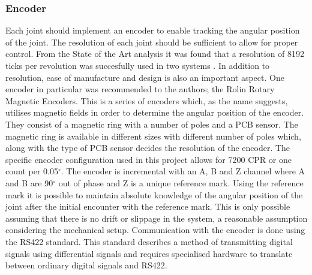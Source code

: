\subsubsection{Encoder} %
\label{ssub:encoder}
Each joint should implement an encoder to enable tracking the angular position of the joint.
The resolution of each joint should be sufficient to allow for proper control.
From the State of the Art analysis it was found that a resolution of 8192 ticks per revolution was succesfully used in two systems
.
In addition to resolution, ease of manufacture and design is also an important aspect.
One encoder in particular was recommended to the authors; the Rolin Rotary Magnetic Encoders.
This is a series of encoders which, as the name suggests, utilises magnetic fields in order to determine the angular position of the encoder.
They consist of a magnetic ring with a number of poles and a PCB sensor.
The magnetic ring is available in different sizes with different number of poles which, along with the type of PCB sensor decides the resolution of the encoder.
The specific encoder configuration used in this project allows for 7200 CPR or one count per 0.05$^\circ$.
The encoder is incremental with an A, B and Z channel where A and B are 90$^\circ$ out of phase and Z is a unique reference mark.
Using the reference mark it is possible to maintain absolute knowledge of the angular position of the joint after the initial encounter with the reference mark.
This is only possible assuming that there is no drift or slippage in the system, a reasonable assumption considering the mechanical setup.
Communication with the encoder is done using the RS422 standard.
This standard describes a method of transmitting digital signals using differential signals and requires specialised hardware to translate between ordinary digital signals and RS422.


